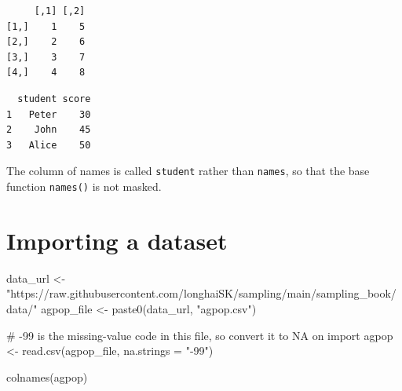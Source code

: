 \documentclass[
  letterpaper,
  DIV=11,
  numbers=noendperiod]{scrreprt}
\newenvironment{Shaded}{\begin{snugshade}}{\end{snugshade}}
\newcommand{\AttributeTok}[1]{\textcolor[rgb]{0.40,0.45,0.13}{#1}}
\newcommand{\CommentTok}[1]{\textcolor[rgb]{0.37,0.37,0.37}{#1}}
\newcommand{\DecValTok}[1]{\textcolor[rgb]{0.68,0.00,0.00}{#1}}
\newcommand{\FunctionTok}[1]{\textcolor[rgb]{0.28,0.35,0.67}{#1}}
\newcommand{\NormalTok}[1]{\textcolor[rgb]{0.00,0.23,0.31}{#1}}
\newcommand{\OtherTok}[1]{\textcolor[rgb]{0.00,0.23,0.31}{#1}}
\newcommand{\SpecialCharTok}[1]{\textcolor[rgb]{0.37,0.37,0.37}{#1}}
\newcommand{\StringTok}[1]{\textcolor[rgb]{0.13,0.47,0.30}{#1}}
\renewcommand{\[}{\begin{equation}}
\renewcommand{\]}{\end{equation}}
\begin{document}
\begin{verbatim}
     [,1] [,2]
[1,]    1    5
[2,]    2    6
[3,]    3    7
[4,]    4    8
\end{verbatim}

\begin{Shaded}
\end{Shaded}

\begin{verbatim}
  student score
1   Peter    30
2    John    45
3   Alice    50
\end{verbatim}

The column of names is called \texttt{student} rather than
\texttt{names}, so that the base function \texttt{names()} is not
masked.

\section{Importing a dataset}\label{importing-a-dataset}

\begin{Shaded}
\begin{Highlighting}[]
\NormalTok{data\_url }\OtherTok{\textless{}{-}} \StringTok{"https://raw.githubusercontent.com/longhaiSK/sampling/main/sampling\_book/data/"}
\NormalTok{agpop\_file }\OtherTok{\textless{}{-}} \FunctionTok{paste0}\NormalTok{(data\_url, }\StringTok{"agpop.csv"}\NormalTok{)}

\CommentTok{\# {-}99 is the missing{-}value code in this file, so convert it to NA on import}
\NormalTok{agpop }\OtherTok{\textless{}{-}} \FunctionTok{read.csv}\NormalTok{(agpop\_file, }\AttributeTok{na.strings =} \StringTok{"{-}99"}\NormalTok{)}

\FunctionTok{colnames}\NormalTok{(agpop)}
\end{Highlighting}
\end{Shaded}
\end{document}

